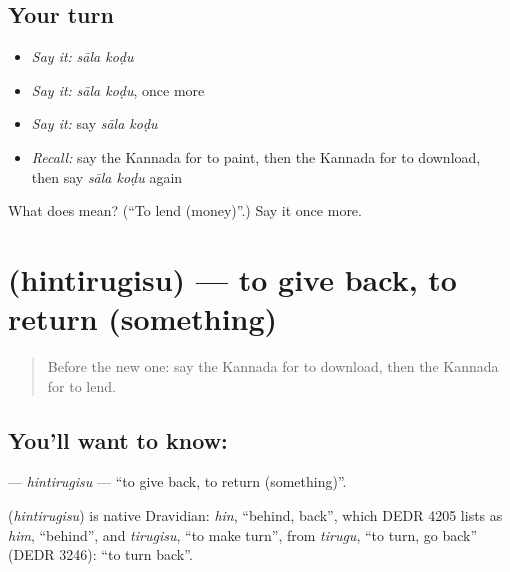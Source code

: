 \subsection*{Your turn}
\begin{itemize}
\raggedright
  \item \emph{Say it:} \emph{sāla koḍu}
  \item \emph{Say it:} \emph{sāla koḍu}, once more
  \item \emph{Say it:} say \emph{sāla koḍu}
  \item \emph{Recall:} say the Kannada for to paint, then the Kannada for to download, then say \emph{sāla koḍu} again
\end{itemize}

\begin{tcolorbox}[breakable,colback=teal!4,colframe=teal!35!black,title={Before you move on}]
What does   mean? (\textquotedblleft{}To lend (money)\textquotedblright{}.) Say it once more.
\end{tcolorbox}
\section[\texorpdfstring{\kn{ಹಿಂತಿರುಗಿಸು} (hintirugisu)}{ಹಿಂತಿರುಗಿಸು (hintirugisu)}]{ (hintirugisu) — to give back, to return (something)}

\label{lesson:KA-C278-hintirugisu}



\begin{quote}
Before the new one: say the Kannada for to download, then the Kannada for to lend.
\end{quote}

\subsection*{You'll want to know: }
\textbf{} — \emph{hintirugisu} — \textquotedblleft{}to give back, to return (something)\textquotedblright{}.

\begin{cousinweb}
\textbf{} (\emph{hintirugisu}) is native Dravidian: \emph{hin}, \textquotedblleft{}behind, back\textquotedblright{}, which DEDR 4205 lists as \emph{him}, \textquotedblleft{}behind\textquotedblright{}, and \emph{tirugisu}, \textquotedblleft{}to make turn\textquotedblright{}, from \emph{tirugu}, \textquotedblleft{}to turn, go back\textquotedblright{} (DEDR 3246): \textquotedblleft{}to turn back\textquotedblright{}.
\end{cousinweb}

